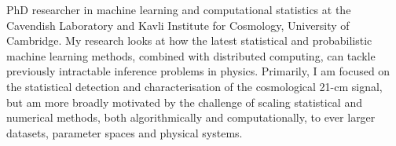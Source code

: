 \par
\vspace{1.90mm}
\begin{cvparagraph}
PhD researcher in machine learning and computational statistics at the Cavendish Laboratory and Kavli Institute for Cosmology, University of Cambridge. My research looks at how the latest statistical and probabilistic machine learning methods, combined with distributed computing, can tackle previously intractable inference problems in physics. Primarily, I am focused on the statistical detection and characterisation of the cosmological 21-cm signal, but am more broadly motivated by the challenge of scaling statistical and numerical methods, both algorithmically and computationally, to ever larger datasets, parameter spaces and physical systems.
\end{cvparagraph}
